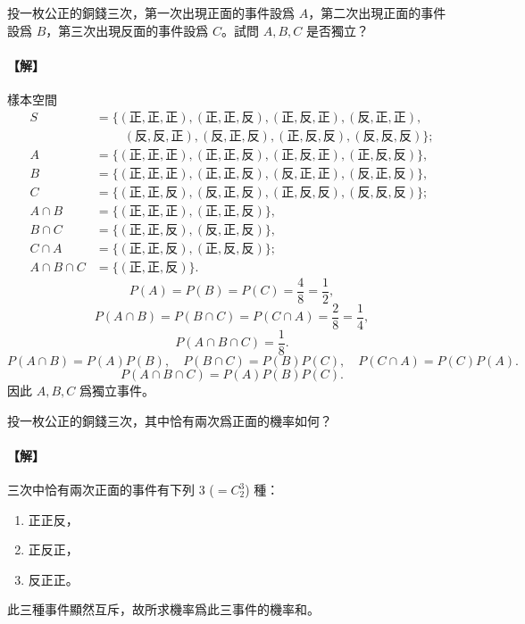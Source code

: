 \medskip
\begin{discussion}\label{disc:b5-3-4}
投一枚公正的銅錢三次，第一次出現正面的事件設爲 $A$，第二次出現正面的事件設爲 $B$，第三次出現反面的事件設爲 $C$。試問 $A, B, C$ 是否獨立？
\end{discussion}
\paragraph{【解】}
樣本空間
\begin{align*}
S &= \{(\text{正}, \text{正}, \text{正}), (\text{正}, \text{正}, \text{反}), (\text{正}, \text{反}, \text{正}), (\text{反}, \text{正}, \text{正}), \\
  &\phantom{{}=\{ \ \ } (\text{反}, \text{反}, \text{正}), (\text{反}, \text{正}, \text{反}), (\text{正}, \text{反}, \text{反}), (\text{反}, \text{反}, \text{反})\}; \\
A &= \{(\text{正}, \text{正}, \text{正}), (\text{正}, \text{正}, \text{反}), (\text{正}, \text{反}, \text{正}), (\text{正}, \text{反}, \text{反})\}, \\
B &= \{(\text{正}, \text{正}, \text{正}), (\text{正}, \text{正}, \text{反}), (\text{反}, \text{正}, \text{正}), (\text{反}, \text{正}, \text{反})\}, \\
C &= \{(\text{正}, \text{正}, \text{反}), (\text{反}, \text{正}, \text{反}), (\text{正}, \text{反}, \text{反}), (\text{反}, \text{反}, \text{反})\}; \\
A \cap B &= \{(\text{正}, \text{正}, \text{正}), (\text{正}, \text{正}, \text{反})\}, \\
B \cap C &= \{(\text{正}, \text{正}, \text{反}), (\text{反}, \text{正}, \text{反})\}, \\
C \cap A &= \{(\text{正}, \text{正}, \text{反}), (\text{正}, \text{反}, \text{反})\}; \\
A \cap B \cap C &= \{(\text{正}, \text{正}, \text{反})\}.
\end{align*}
\[
P(A) = P(B) = P(C) = \frac{4}{8} = \frac{1}{2},
\]
\[
P(A \cap B) = P(B \cap C) = P(C \cap A) = \frac{2}{8} = \frac{1}{4},
\]
\[
P(A \cap B \cap C) = \frac{1}{8}.
\]
\[
P(A \cap B) = P(A)P(B),\quad P(B \cap C) = P(B)P(C),\quad P(C \cap A) = P(C)P(A).
\]
\[
P(A \cap B \cap C) = P(A)P(B)P(C).
\]
因此 $A, B, C$ 爲獨立事件。

\medskip
\begin{discussion}\label{disc:b5-3-5}
投一枚公正的銅錢三次，其中恰有兩次爲正面的機率如何？
\end{discussion}
\paragraph{【解】}
三次中恰有兩次正面的事件有下列 $3$ ($=C_2^3$) 種：
\begin{enumerate}[1.]
  \item 正正反，
  \item 正反正，
  \item 反正正。
\end{enumerate}
此三種事件顯然互斥，故所求機率爲此三事件的機率和。

